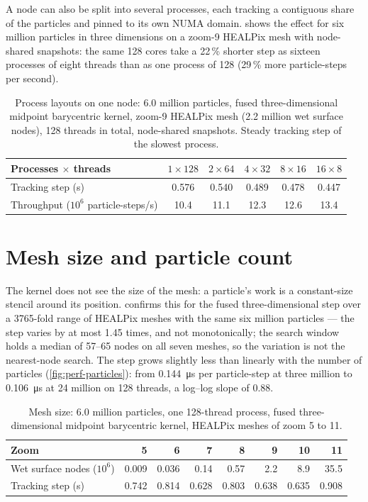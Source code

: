A node can also be split into several processes, each tracking a contiguous share of the
particles and pinned to its own NUMA domain.  shows the effect for six million
particles in three dimensions on a zoom-9 HEALPix mesh with node-shared snapshots: the same 128 cores
take a 22\,\% shorter step as sixteen processes of eight threads than as one process of 128 (29\,\% more
particle-steps per second).

\begin{table}[t]
\centering\small
\caption{Process layouts on one node: 6.0 million particles, fused three-dimensional midpoint
barycentric kernel, zoom-9 HEALPix mesh (2.2 million wet surface nodes), 128 threads in total,
node-shared snapshots. Steady tracking step of the slowest process.}
\label{tab:perf-layouts}
\begin{tabular}{@{}lccccc@{}}
\toprule
Processes $\times$ threads & $1\times128$ & $2\times64$ & $4\times32$ & $8\times16$ & $16\times8$ \\
\midrule
Tracking step (s) & 0.576 & 0.540 & 0.489 & 0.478 & 0.447 \\
Throughput ($10^6$ particle-steps/s) & 10.4 & 11.1 & 12.3 & 12.6 & 13.4 \\
\bottomrule
\end{tabular}
\end{table}

\section{Mesh size and particle count}\label{sec:perf-mesh}

The kernel does not see the size of the mesh: a particle's work is a constant-size stencil around
its position.  confirms this for the fused three-dimensional step over a
3765-fold range of HEALPix meshes with the same six million particles --- the step varies by at most
1.45 times, and not monotonically; the search window holds a median of 57--65 nodes on all seven
meshes, so the variation is not the nearest-node search. The step grows slightly less than linearly
with the number of particles (\cref{fig:perf-particles}): from \SI{0.144}{\micro s} per particle-step at
three million to \SI{0.106}{\micro s} at 24 million on 128 threads, a log--log slope of 0.88.

\begin{table}[t]
\centering\small
\caption{Mesh size: 6.0 million particles, one 128-thread process, fused three-dimensional midpoint
barycentric kernel, HEALPix meshes of zoom 5 to 11.}
\label{tab:perf-mesh}
\begin{tabular}{@{}lrrrrrrr@{}}
\toprule
Zoom & 5 & 6 & 7 & 8 & 9 & 10 & 11 \\
\midrule
Wet surface nodes ($10^6$) & 0.009 & 0.036 & 0.14 & 0.57 & 2.2 & 8.9 & 35.5 \\
Tracking step (s) & 0.742 & 0.814 & 0.628 & 0.803 & 0.638 & 0.635 & 0.908 \\
\bottomrule
\end{tabular}
\end{table}

